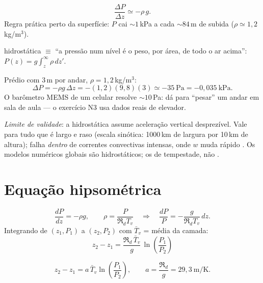 \documentclass[11pt]{article}
\begin{document}
\begin{formalivro}[Stull eq.~1.25]
\[ \frac{\Delta P}{\Delta z} \simeq -\rho\,g. \]
Regra prática perto da superfície: $P$ cai $\sim1$\,kPa a cada $\sim84$\,m
de subida ($\rho\simeq1{,}2$\,kg/m$^3$).
\end{formalivro}

\begin{noquadro}
hidrostática $\equiv$ ``a pressão num nível é o peso, por área, de todo o ar
acima'':\quad $P(z) = g\displaystyle\int_z^\infty \rho\,dz'$.
\end{noquadro}

\begin{exemplo}
Prédio com $3$\,m por andar, $\rho=1{,}2$\,kg/m$^3$:
\[ \Delta P = -\rho g\,\Delta z = -(1{,}2)(9{,}8)(3) \simeq -35\ \mathrm{Pa}
 = -0{,}035\ \mathrm{kPa}. \]
O barômetro MEMS de um celular resolve $\sim10$\,Pa: dá para ``pesar'' um
andar em sala de aula — o exercício N3 usa dados reais de elevador.
\end{exemplo}

\emph{Limite de validade}: a hidrostática assume aceleração vertical
desprezível. Vale para tudo que é largo e raso (escala sinótica: 1000\,km de
largura por 10\,km de altura); falha \emph{dentro} de correntes convectivas
intensas, onde $w$ muda rápido . Os modelos
numéricos globais são hidrostáticos; os de tempestade, não
.

\section{Equação hipsométrica}\label{sec:hipso}


\begin{formadif}[dedução]
\[ \frac{dP}{dz} = -\rho g, \qquad \rho = \frac{P}{\Re_d T_v}
\quad\Longrightarrow\quad
\frac{dP}{P} = -\frac{g}{\Re_d T_v}\,dz. \]
Integrando de $(z_1,P_1)$ a $(z_2,P_2)$ com $\bar T_v$ = média da camada:
\[ \boxed{\ z_2 - z_1 = \frac{\Re_d\,\bar T_v}{g}\,
   \ln\!\left(\frac{P_1}{P_2}\right)\ } \]
\end{formadif}

\begin{formalivro}[Stull eq.~1.26]
\[ z_2 - z_1 = a\,\bar T_v \ln\!\left(\frac{P_1}{P_2}\right), \qquad
   a = \frac{\Re_d}{g} = 29{,}3\ \mathrm{m/K}. \]
\end{formalivro}
\end{document}
